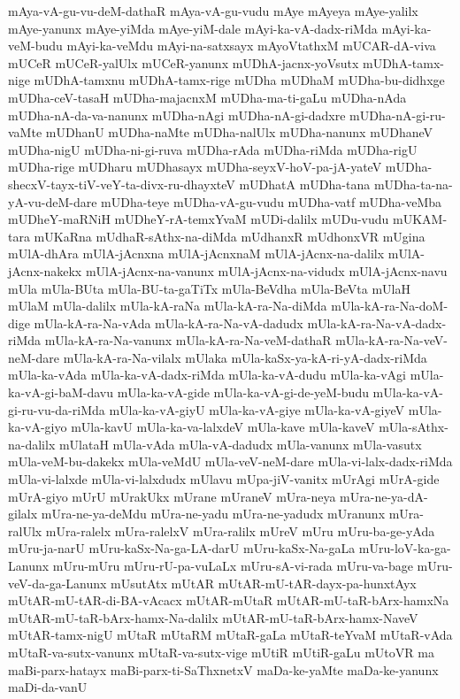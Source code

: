 {mAya-vA-gu-vu-deM-dathaR
mAya-vA-gu-vudu
mAye
mAyeya
mAye-yalilx
mAye-yanunx
mAye-yiMda
mAye-yiM-dale
mAyi-ka-vA-dadx-riMda
mAyi-ka-veM-budu
mAyi-ka-veMdu
mAyi-na-satxsayx
mAyoVtathxM
mUCAR-dA-viva
mUCeR
mUCeR-yalUlx
mUCeR-yanunx
mUDhA-jacnx-yoVsutx
mUDhA-tamx-nige
mUDhA-tamxnu
mUDhA-tamx-rige
mUDha
mUDhaM
mUDha-bu-didhxge
mUDha-ceV-tasaH
mUDha-majacnxM
mUDha-ma-ti-gaLu
mUDha-nAda
mUDha-nA-da-va-nanunx
mUDha-nAgi
mUDha-nA-gi-dadxre
mUDha-nA-gi-ru-vaMte
mUDhanU
mUDha-naMte
mUDha-nalUlx
mUDha-nanunx
mUDhaneV
mUDha-nigU
mUDha-ni-gi-ruva
mUDha-rAda
mUDha-riMda
mUDha-rigU
mUDha-rige
mUDharu
mUDhasayx
mUDha-seyxV-hoV-pa-jA-yateV
mUDha-shecxV-tayx-tiV-veY-ta-divx-ru-dhayxteV
mUDhatA
mUDha-tana
mUDha-ta-na-yA-vu-deM-dare
mUDha-teye
mUDha-vA-gu-vudu
mUDha-vatf
mUDha-veMba
mUDheY-maRNiH
mUDheY-rA-temxYvaM
mUDi-dalilx
mUDu-vudu
mUKAM-tara
mUKaRna
mUdhaR-sAthx-na-diMda
mUdhanxR
mUdhonxVR
mUgina
mUlA-dhAra
mUlA-jAcnxna
mUlA-jAcnxnaM
mUlA-jAcnx-na-dalilx
mUlA-jAcnx-nakekx
mUlA-jAcnx-na-vanunx
mUlA-jAcnx-na-vidudx
mUlA-jAcnx-navu
mUla
mUla-BUta
mUla-BU-ta-gaTiTx
mUla-BeVdha
mUla-BeVta
mUlaH
mUlaM
mUla-dalilx
mUla-kA-raNa
mUla-kA-ra-Na-diMda
mUla-kA-ra-Na-doM-dige
mUla-kA-ra-Na-vAda
mUla-kA-ra-Na-vA-dadudx
mUla-kA-ra-Na-vA-dadx-riMda
mUla-kA-ra-Na-vanunx
mUla-kA-ra-Na-veM-dathaR
mUla-kA-ra-Na-veV-neM-dare
mUla-kA-ra-Na-vilalx
mUlaka
mUla-kaSx-ya-kA-ri-yA-dadx-riMda
mUla-ka-vAda
mUla-ka-vA-dadx-riMda
mUla-ka-vA-dudu
mUla-ka-vAgi
mUla-ka-vA-gi-baM-davu
mUla-ka-vA-gide
mUla-ka-vA-gi-de-yeM-budu
mUla-ka-vA-gi-ru-vu-da-riMda
mUla-ka-vA-giyU
mUla-ka-vA-giye
mUla-ka-vA-giyeV
mUla-ka-vA-giyo
mUla-kavU
mUla-ka-va-lalxdeV
mUla-kave
mUla-kaveV
mUla-sAthx-na-dalilx
mUlataH
mUla-vAda
mUla-vA-dadudx
mUla-vanunx
mUla-vasutx
mUla-veM-bu-dakekx
mUla-veMdU
mUla-veV-neM-dare
mUla-vi-lalx-dadx-riMda
mUla-vi-lalxde
mUla-vi-lalxdudx
mUlavu
mUpa-jiV-vanitx
mUrAgi
mUrA-gide
mUrA-giyo
mUrU
mUrakUkx
mUrane
mUraneV
mUra-neya
mUra-ne-ya-dA-gilalx
mUra-ne-ya-deMdu
mUra-ne-yadu
mUra-ne-yadudx
mUranunx
mUra-ralUlx
mUra-ralelx
mUra-ralelxV
mUra-ralilx
mUreV
mUru
mUru-ba-ge-yAda
mUru-ja-narU
mUru-kaSx-Na-ga-LA-darU
mUru-kaSx-Na-gaLa
mUru-loV-ka-ga-Lanunx
mUru-mUru
mUru-rU-pa-vuLaLx
mUru-sA-vi-rada
mUru-va-bage
mUru-veV-da-ga-Lanunx
mUsutAtx
mUtAR
mUtAR-mU-tAR-dayx-pa-hunxtAyx
mUtAR-mU-tAR-di-BA-vAcacx
mUtAR-mUtaR
mUtAR-mU-taR-bArx-hamxNa
mUtAR-mU-taR-bArx-hamx-Na-dalilx
mUtAR-mU-taR-bArx-hamx-NaveV
mUtAR-tamx-nigU
mUtaR
mUtaRM
mUtaR-gaLa
mUtaR-teYvaM
mUtaR-vAda
mUtaR-va-sutx-vanunx
mUtaR-va-sutx-vige
mUtiR
mUtiR-gaLu
mUtoVR
ma
maBi-parx-hatayx
maBi-parx-ti-SaThxnetxV
maDa-ke-yaMte
maDa-ke-yanunx
maDi-da-vanU
}
